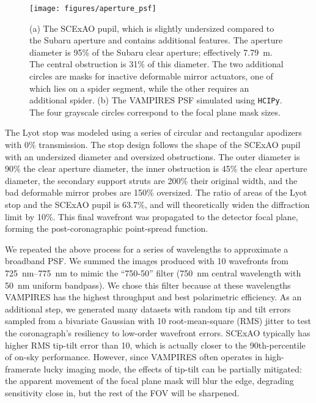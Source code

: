 \documentclass[]{spie}  %
\begin{document}
\begin{figure}
   \centering
   \texttt{[image: figures/aperture\_psf]}
   \caption{(a) The SCExAO pupil, which is slightly undersized compared to the Subaru aperture and contains additional features. The aperture diameter is 95\% of the Subaru clear aperture; effectively \qty{7.79}{\meter}. The central obstruction is 31\% of this diameter. The two additional circles are masks for inactive deformable mirror actuators, one of which lies on a spider segment, while the other requires an additional spider. (b) The VAMPIRES PSF simulated using \texttt{HCIPy}. The four grayscale circles correspond to the focal plane mask sizes.}\label{fig:pupil}
\end{figure}

The Lyot stop was modeled using a series of circular and rectangular apodizers with 0\% transmission. The stop design follows the shape of the SCExAO pupil with an undersized diameter and oversized obstructions. The outer diameter is 90\% the clear aperture diameter, the inner obstruction is 45\% the clear aperture diameter, the secondary support struts are 200\% their original width, and the bad deformable mirror probes are 150\% oversized. The ratio of areas of the Lyot stop and the SCExAO pupil is 63.7\%, and will theoretically widen the diffraction limit by 10\%. This final wavefront was propagated to the detector focal plane, forming the post-coronagraphic point-spread function.

We repeated the above process for a series of wavelengths to approximate a broadband PSF. We summed the images produced with 10 wavefronts from \qtyrange{725}{775}{\nano\meter} to mimic the ``750-50'' filter (\qty{750}{\nano\meter} central wavelength with \qty{50}{\nano\meter} uniform bandpass). We chose this filter because at these wavelengths VAMPIRES has the highest throughput and best polarimetric efficiency. As an additional step, we generated many datasets with random tip and tilt errors sampled from a bivariate Gaussian with \qty{10}{\milliarcsecond} root-mean-square (RMS) jitter to test the coronagraph's resiliency to low-order wavefront errors. SCExAO typically has higher RMS tip-tilt error than \qty{10}{\milliarcsecond}, which is actually closer to the 90th-percentile of on-sky performance. However, since VAMPIRES often operates in high-framerate lucky imaging mode, the effects of tip-tilt can be partially mitigated: the apparent movement of the focal plane mask will blur the edge, degrading sensitivity close in, but the rest of the FOV will be sharpened.
\end{document}
